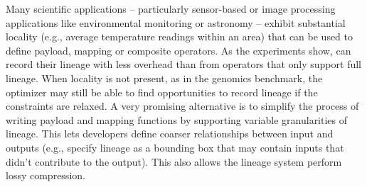 Many scientific applications -- particularly sensor-based or image processing
applications like environmental monitoring or astronomy -- exhibit substantial
locality (e.g., average temperature readings within an area) that can be used
to define payload, mapping or composite operators.  As the experiments show,
\sys{} can  record their lineage with less overhead than from operators that
only support full lineage. When locality is not present, as in the genomics
benchmark,  the optimizer may still be able to find opportunities to record
lineage if the constraints are relaxed.  A very promising alternative is to
simplify the process of writing payload and mapping functions by supporting
variable granularities of lineage.  This lets developers define coarser
relationships between input and outputs (e.g., specify lineage as a bounding
box that may contain inputs that didn't contribute to the output). This also
allows the lineage system perform lossy compression.






%

